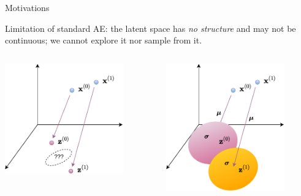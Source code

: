 \documentclass{beamer}
\begin{document}
  \begin{frame}{Motivations}
    
    Limitation of standard AE: the latent space has \emph{no structure} and may not be continuous; we cannot explore it nor sample from it.

    \begin{columns}[T,onlytextwidth]
      \centering
      \includegraphics[width=0.8\textwidth]{rc/ae-latent}

      \centering
      \includegraphics[width=0.8\textwidth]{rc/vae-latent}
    \end{columns}

  \end{frame}
\end{document}
